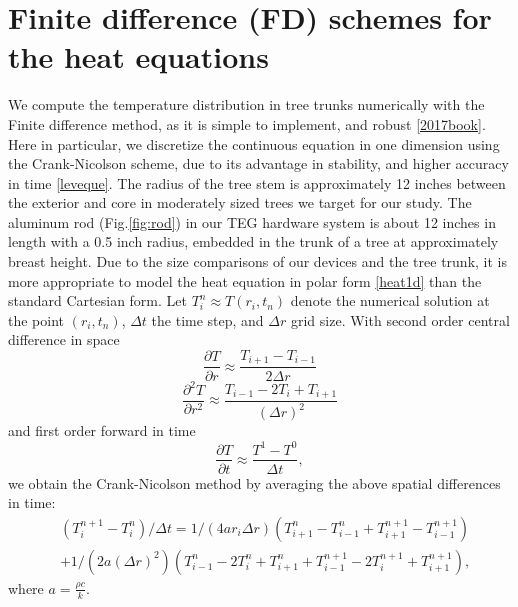 \documentclass{IEEEtran} %
\begin{document}
\section{Finite difference (FD) schemes for the heat equations}
We compute the temperature distribution in tree trunks numerically with the Finite difference method, as it is simple to implement, and robust \ref{2017book}. Here in particular, we discretize the continuous equation in one dimension using the Crank-Nicolson scheme, due to its advantage in stability, and higher accuracy in time \ref{leveque}. %
The radius of the tree stem is approximately 12 inches between the exterior and core in moderately sized trees we target for our study. The aluminum rod (Fig.\ref{fig:rod}) in our TEG hardware system  is about 12 inches in length with a 0.5 inch radius, embedded in the trunk of a tree at approximately breast height. Due to the size comparisons of our devices and the tree trunk, it is more appropriate to model the heat equation in polar form \eqref{heat1d} than the standard Cartesian form. Let $T^n_{i} \approx T(r_i,t_n)$ denote the numerical solution at the point $(r_i,t_n)$, $\Delta t$ the time step, and $\Delta r$ grid size. 
With second order central difference in space 
\begin{equation}\frac{\partial T}{\partial r}\approx\frac{T_{i+1}-T_{i-1}}{2\Delta r}\end{equation}
\begin{equation}\frac{\partial^2 T}{\partial r^2}\approx\frac{T_{i-1}-2T_{i}+T_{i+1}}{(\Delta r)^2}\end{equation}
and first order forward in time
\begin{equation}\frac{\partial T}{\partial t}\approx\frac{T^1-T^0}{\Delta t},\end{equation}
we obtain the Crank-Nicolson method by averaging the above spatial differences in time:
\begin{align}
&(T^{n+1}_i - T^n_i)/\Delta t = 1/(4ar_i\Delta r)(T^n_{i+1}-T^n_{i-1} + T^{n+1}_{i+1}-T^{n+1}_{i-1} )\nonumber\\
&+1/(2a(\Delta r)^2)(T^n_{i-1} - 2T^n_i + T^n_{i+1} + T^{n+1}_{i-1} - 2T^{n+1}_i + T^{n+1}_{i+1}),\label{1dCNscheme}
\end{align}
where $a = \frac{\rho c}{k}$.
\end{document}

